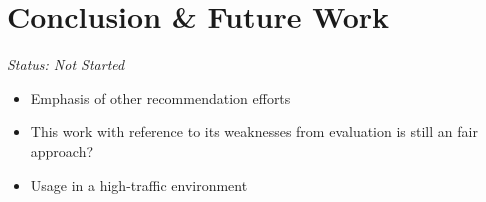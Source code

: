\chapter{Conclusion \& Future Work}

\emph{Status: Not Started}

\begin{itemize}
\item Emphasis of other recommendation efforts
\item This work with reference to its weaknesses from evaluation is still an fair approach?
\item Usage in a high-traffic environment
\end{itemize}